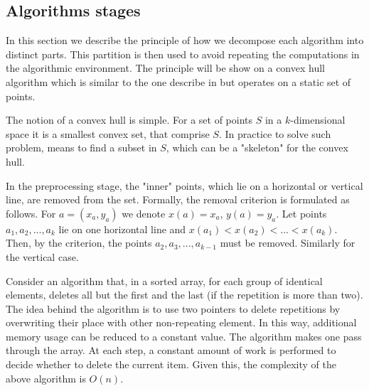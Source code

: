 \documentclass[sigconf]{acmart}
\begin{document}
\subsection{Algorithms stages}




	In this section we describe the principle of how we decompose each algorithm into distinct parts. This partition is then used to avoid repeating the computations in the algorithmic environment. The principle will be show on a convex hull algorithm which is similar to the one describe in \cite{overmars} but operates on a static set of points.

	The notion of a convex hull is simple. For a set of points $S$ in a $k$-dimensional space it is a smallest convex set, that comprise $S$. In practice to solve such problem, means to find a subset in $S$, which can be a "skeleton" for the convex hull.



		In the preprocessing stage, the "inner" points, which lie on a horizontal or vertical line, are removed from the set. Formally, the removal criterion is formulated as follows. For $a = (x_a, y_a)$ we denote $x(a)=x_a$, $y(a)=y_a$. Let points $a_1, a_2, ..., a_k$ lie on one horizontal line and $x(a_1) < x(a_2) <... <x (a_k) $. Then, by the criterion, the points $a_2, a_3, ..., a_{k-1}$ must be removed. Similarly for the vertical case.
		
		Consider an algorithm that, in a sorted array, for each group of identical elements, deletes all but the first and the last (if the repetition is more than two). The idea behind the algorithm is to use two pointers to delete repetitions by overwriting their place with other non-repeating element. In this way, additional memory usage can be reduced to a constant value. The algorithm makes one pass through the array. At each step, a constant amount of work is performed to decide whether to delete the current item. Given this, the complexity of the above algorithm is $O(n)$.
		
\end{document}
